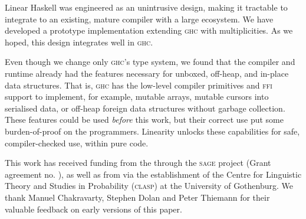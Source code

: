 \documentclass[acmsmall,screen]{acmart}\settopmatter{}
\newcommand{\ghc}{\textsc{ghc}\xspace}
\newcommand\HaskeLL{Linear Haskell\xspace{}}
\begin{document}
\HaskeLL{} was engineered as an unintrusive design, making it tractable
to integrate to an existing, mature compiler with a large ecosystem.
We have developed a prototype implementation extending
\textsc{ghc} with multiplicities. As we hoped, this
design integrates well in \textsc{ghc}.

Even though we change only \ghc's type system, we found that the
compiler and runtime already had the features necessary for unboxed,
off-heap, and in-place data structures.  That is, \ghc{} has the
low-level compiler primitives and \textsc{ffi} support to implement,
for example, mutable arrays, mutable cursors into serialised data, or
off-heap foreign data structures without garbage collection.  These
features could be used {\em before} this work, but their correct use
put some burden-of-proof on the programmers. Linearity unlocks these
capabilities for safe, compiler-checked use, within pure code.




\begin{acks}                            %
  This work has received funding from the  through the \textsc{sage} project
  (Grant agreement
  no. ), as well as
  from 
  via the establishment of the Centre for Linguistic Theory and
  Studies in Probability (\textsc{clasp}) at the University of Gothenburg.
  We thank Manuel Chakravarty, Stephen Dolan and Peter Thiemann for their valuable
  feedback on early versions of this paper.
\end{acks}

{}
\end{document}
